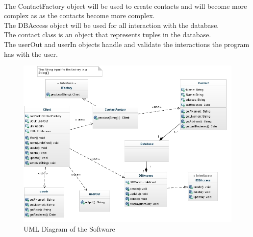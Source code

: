 \documentclass{article}
\begin{document}
\paragraph{}
The ContactFactory object will be used to create contacts and will become more complex as as the contacts become more complex. \\
The DBAccess object will be used for all interaction with the database. \\
The contact class is an object that represents tuples in the database. \\
The userOut and userIn objects handle and validate the interactions the program has with the user. \\
\begin{figure}[H]
\centering
\includegraphics[width=180mm]{img/UML2.jpg}
\caption{UML Diagram of the Software \label{UML}}
\end{figure}


\end{document}
